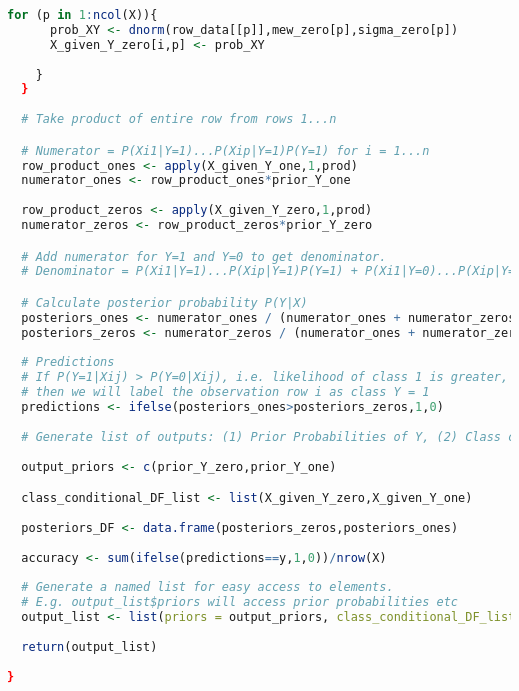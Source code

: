 \documentclass{article}
\begin{document}
\begin{lstlisting}[language=R]
    for (p in 1:ncol(X)){
      prob_XY <- dnorm(row_data[[p]],mew_zero[p],sigma_zero[p])
      X_given_Y_zero[i,p] <- prob_XY
      
    }    
  }
  
  # Take product of entire row from rows 1...n

  # Numerator = P(Xi1|Y=1)...P(Xip|Y=1)P(Y=1) for i = 1...n
  row_product_ones <- apply(X_given_Y_one,1,prod) 
  numerator_ones <- row_product_ones*prior_Y_one
  
  row_product_zeros <- apply(X_given_Y_zero,1,prod)
  numerator_zeros <- row_product_zeros*prior_Y_zero 

  # Add numerator for Y=1 and Y=0 to get denominator.
  # Denominator = P(Xi1|Y=1)...P(Xip|Y=1)P(Y=1) + P(Xi1|Y=0)...P(Xip|Y=1)P(Y=0)

  # Calculate posterior probability P(Y|X)  
  posteriors_ones <- numerator_ones / (numerator_ones + numerator_zeros)
  posteriors_zeros <- numerator_zeros / (numerator_ones + numerator_zeros)
  
  # Predictions
  # If P(Y=1|Xij) > P(Y=0|Xij), i.e. likelihood of class 1 is greater, 
  # then we will label the observation row i as class Y = 1
  predictions <- ifelse(posteriors_ones>posteriors_zeros,1,0)
  
  # Generate list of outputs: (1) Prior Probabilities of Y, (2) Class conditional probabilities P(Xij|Y=k), (3) Posterior probabilities, (4) Predicted Labels for each data row, (5) accuracy
  
  output_priors <- c(prior_Y_zero,prior_Y_one)

  class_conditional_DF_list <- list(X_given_Y_zero,X_given_Y_one)
  
  posteriors_DF <- data.frame(posteriors_zeros,posteriors_ones)
  
  accuracy <- sum(ifelse(predictions==y,1,0))/nrow(X)
  
  # Generate a named list for easy access to elements. 
  # E.g. output_list$priors will access prior probabilities etc
  output_list <- list(priors = output_priors, class_conditional_DF_list = class_conditional_DF_list, posteriors_DF = posteriors_DF, predictions = predictions, means_zero = mew_zero, means_one = mew_one, accuracy = accuracy,sigma_one = sigma_one,sigma_zero = sigma_zero)
  
  return(output_list)
  
}
\end{lstlisting}

\newpage
\end{document}
